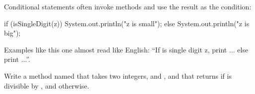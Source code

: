 Conditional statements often invoke  methods and use the result as the condition:

\begin{code}
if (isSingleDigit(z)) {
    System.out.println("z is small");
} else {
    System.out.println("z is big");
}
\end{code}

Examples like this one almost read like English:
``If is single digit z, print ... else print ...''.


\begin{exercise}  %
\label{ex.isdiv}

Write a method named  that takes two integers,  and , and that returns  if  is divisible by , and  otherwise.

\end{exercise}
